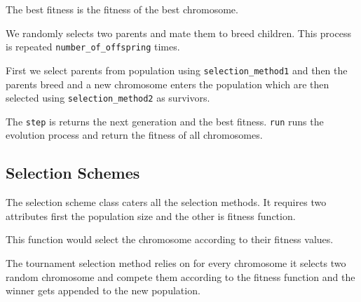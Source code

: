 \documentclass[12pt]{report}
\theoremstyle{mytheoremstyle}
\theoremstyle{mytheoremstyle}
\theoremstyle{myproblemstyle}
\begin{document}
\newpage

The best fitness is the fitness of the best chromosome.

We randomly selects two parents and mate them to breed children. This process is repeated \lstinline|number_of_offspring| times.


\newpage

First we select parents from population using \lstinline|selection_method1| and then the parents breed and a new chromosome enters the population which are then selected using \lstinline|selection_method2| as survivors.


\newpage

The \lstinline{step} is returns the next generation and the best fitness. \lstinline{run} runs the evolution process and return the fitness of all chromosomes.


\newpage

\subsection{Selection Schemes}
The selection scheme class caters all the selection methods. It requires two attributes first the population size and the other is fitness function.


\newpage

This function would select the chromosome according to their fitness values.


\newpage

The tournament selection method relies on for every chromosome it selects two random chromosome and compete them according to the fitness function and the winner gets appended to the new population.

\end{document}
